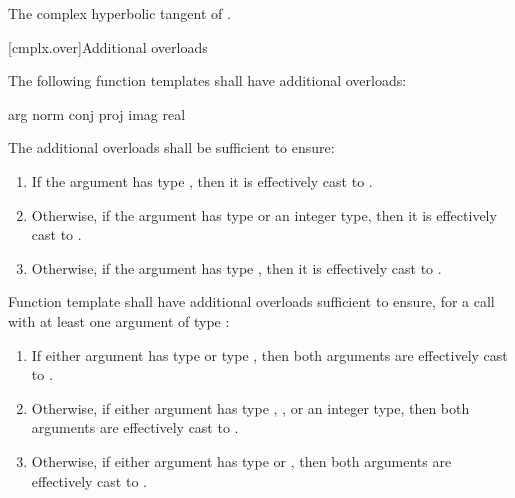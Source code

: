 \begin{itemdescr}
\pnum
\returns
The complex hyperbolic tangent of .
\end{itemdescr}

[cmplx.over]{Additional overloads}

\pnum
{}%
%
%
%
%
The following function templates shall have additional overloads:
\begin{codeblock}
arg                   norm
conj                  proj
imag                  real
\end{codeblock}

\pnum
{}%
The additional overloads shall be sufficient to ensure:

\begin{enumerate}
        \item If the argument has type , then it is effectively
              cast to .
        \item Otherwise, if the argument has type  or an integer type,
              then it is effectively cast to .
        \item Otherwise, if the argument has type , then it is
              effectively cast to .
\end{enumerate}

\pnum
{}%
Function template  shall have additional overloads sufficient to
ensure, for a call with at least one argument of type :

\begin{enumerate}

  \item If either argument has type  or type , then both arguments are effectively cast to
        .
  \item Otherwise, if either argument has type , ,
        or an integer type, then both arguments are effectively cast to
        .
  \item Otherwise, if either argument has type  or ,
        then both arguments are effectively cast to .
\end{enumerate}

